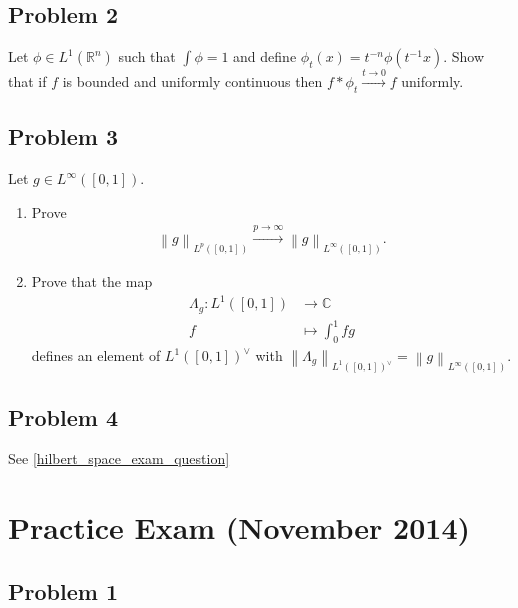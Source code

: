 \hypertarget{problem-2-1}{%
\subsection{Problem 2}\label{problem-2-1}}

Let \(\phi\in L^1({\mathbb{R}}^n)\) such that \(\int \phi = 1\) and
define \(\phi_t(x) = t^{-n}\phi(t^{-1}x)\). Show that if \(f\) is
bounded and uniformly continuous then
\(f\ast \phi_t \overset{t\to 0}\to f\) uniformly.

\hypertarget{problem-3-1}{%
\subsection{Problem 3}\label{problem-3-1}}

Let \(g\in L^\infty([0, 1])\).

\begin{enumerate}
\def\labelenumi{\alph{enumi}.}
\item
  Prove
  \begin{align*}
  {\left\lVert {g} \right\rVert}_{L^p([0, 1])}  \overset{p\to\infty}\to {\left\lVert {g} \right\rVert}_{L^\infty([0, 1])}
  .\end{align*}
\item
  Prove that the map
  \begin{align*}
  \Lambda_g: L^1([0, 1]) &\to {\mathbb{C}}\\
  f &\mapsto \int_0^1 fg
  \end{align*}
  defines an element of \(L^1([0, 1])^\vee\) with
  \({\left\lVert {\Lambda_g} \right\rVert}_{L^1([0, 1])^\vee}= {\left\lVert {g} \right\rVert}_{L^\infty([0, 1])}\).
\end{enumerate}

\hypertarget{problem-4-1}{%
\subsection{Problem 4}\label{problem-4-1}}

See \cref{hilbert_space_exam_question}

\hypertarget{practice-exam-november-2014}{%
\section{Practice Exam (November
2014)}\label{practice-exam-november-2014}}

\hypertarget{problem-1-2}{%
\subsection{Problem 1}\label{problem-1-2}}

